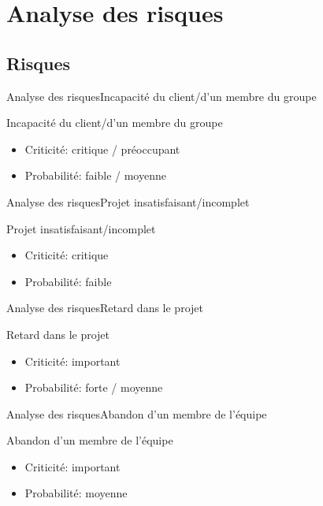 \section{Analyse des risques}
   \subsection{Risques}
     \begin{frame}{Analyse des risques}{Incapacité du client/d'un membre du groupe}
        \begin{block}{Incapacité du client/d'un membre du groupe}
          \begin{itemize}
            \item Criticité: critique / préoccupant
            \item Probabilité: faible / moyenne
          \end{itemize}
        \end{block}
      \end{frame}
      \begin{frame}{Analyse des risques}{Projet insatisfaisant/incomplet}
        \begin{block}{Projet insatisfaisant/incomplet}
          \begin{itemize}
            \item Criticité: critique
            \item Probabilité: faible
          \end{itemize}
        \end{block}
      \end{frame}
      \begin{frame}{Analyse des risques}{Retard dans le projet}
        \begin{block}{Retard dans le projet}
          \begin{itemize}
            \item Criticité: important
            \item Probabilité: forte / moyenne
          \end{itemize}
        \end{block}
      \end{frame}
      \begin{frame}{Analyse des risques}{Abandon d'un membre de l'équipe}
        \begin{block}{Abandon d'un membre de l'équipe}
          \begin{itemize}
            \item Criticité: important
            \item Probabilité: moyenne
          \end{itemize}
        \end{block}
      \end{frame}

